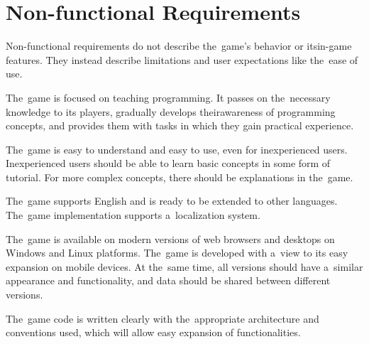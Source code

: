 \section{Non-functional Requirements}

Non-functional requirements do not describe the~game's behavior or its\linebreak{}in-game features.
They instead describe limitations and user expectations like the~ease of use.

\begin{enumerate}[label=\textbf{N\arabic*}, ref=N\arabic*]
     The~game is focused on teaching programming. It passes on the~necessary knowledge to its players, gradually develops their\linebreak{}awareness of programming concepts, and provides them with tasks in which they gain practical experience.
    
     The~game is easy to understand and easy to use, even for inexperienced users.
    Inexperienced users should be able to learn basic concepts in some form of tutorial.
    For more complex concepts, there should be explanations in the~game.

     The~game supports English and is ready to be exten\-ded to other languages.
    The~game implementation supports a~localization system. 

     The~game is available on modern versions of web browsers and desktops on Windows and Linux platforms.
    The~game is developed with a~view to its easy expansion on mobile devices.
    \linebreak
    At the~same time, all versions should have a~similar appearance and functionality, and data should be shared between different versions.

     The~game code is written clearly with the~appropriate architecture and conventions used, which will allow easy expansion of functionalities.    
\end{enumerate}
